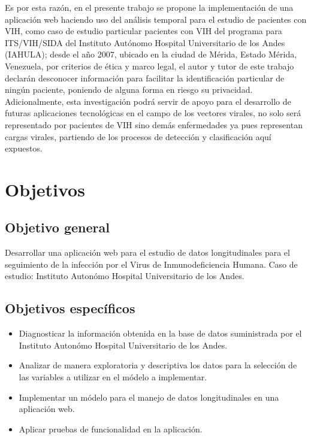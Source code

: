 Es por esta raz\'on, en el presente trabajo se propone la implementaci\'on de una aplicaci\'on web haciendo uso del an\'alisis temporal para el estudio de pacientes con VIH, como caso de estudio particular pacientes con VIH del programa para ITS/VIH/SIDA del Instituto Aut\'onomo Hospital Universitario de los Andes (IAHULA); desde el a\~no 2007, ubicado en la ciudad de M\'erida, Estado M\'erida, Venezuela, por criterios de \'etica y marco legal, el autor y tutor de este trabajo declar\'an desconocer informaci\'on para facilitar la identificaci\'on particular de ning\'un paciente, poniendo de alguna forma en riesgo su privacidad. \\ 

Adicionalmente, esta investigaci\'on podr\'a servir de apoyo para el desarrollo de futuras aplicaciones tecnol\'ogicas en el campo de los vectores virales, no solo ser\'a representado por pacientes de VIH sino dem\'as enfermedades ya pues representan cargas virales, partiendo de los procesos de detecci\'on y clasificaci\'on aqu\'i expuestos.

\section{Objetivos}

\subsection{Objetivo general}

Desarrollar una aplicaci\'on web para el estudio de datos longitudinales para el seguimiento de la infecci\'on por el Virus de Inmunodeficiencia Humana. Caso de estudio: Instituto Auton\'omo Hospital Universitario de los Andes.

\subsection{Objetivos espec\'ificos}
 
\begin{itemize}
\item Diagnosticar la informaci\'on obtenida en la base de datos suministrada por el Instituto Auton\'omo Hospital Universitario de los Andes.
\item Analizar de manera exploratoria y descriptiva los datos para la selecci\'on de las variables a utilizar en el m\'odelo a implementar.
\item Implementar un m\'odelo para el manejo de datos longitudinales en una aplicaci\'on web.
\item Aplicar pruebas de funcionalidad en la aplicaci\'on.

\end{itemize}

